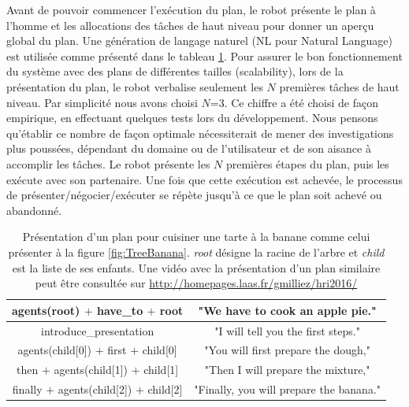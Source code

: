 \documentclass[a4paper,11pt,twoside]{StyleThese}
\begin{document}
Avant de pouvoir commencer l'exécution du plan, le robot présente le plan à l'homme et les allocations des tâches de haut niveau pour donner un aperçu global du plan. Une génération de langage naturel (NL pour Natural Language) est utilisée comme présenté dans le tableau \ref{table:pie-present}. 
Pour assurer le bon fonctionnement du système avec des plans de différentes tailles (scalability), lors de la présentation du plan, le robot verbalise seulement les  $N$ premières tâches de haut niveau. Par simplicité nous avons choisi $N$=$3$. Ce chiffre a été choisi de façon empirique, en effectuant quelques tests lors du développement. Nous pensons qu'établir ce nombre de façon optimale nécessiterait de mener des investigations plus poussées, dépendant du domaine ou de l'utilisateur et de son aisance à accomplir les tâches. Le robot présente les $N$ premières étapes du plan, puis les exécute avec son partenaire. Une fois que cette exécution est achevée, le processus de présenter/négocier/exécuter se répète jusqu'à ce que le plan soit achevé ou abandonné.


 
 
 \begin{table}
\centering
\scriptsize
\renewcommand{\arraystretch}{1.3}
\begin{tabular}{|c|c|}
\hline
   agents(root) $+$ have\_to $+$ root  & "We have to cook an apple pie." \\
   \hline
   introduce\_presentation & "I will tell you the first steps." \\
   \hline
   agents(child[0]) $+$ first $+$ child[0] & "You will first prepare the dough," \\
   \hline
   then $+$ agents(child[1]) $+$  child[1] & "Then I will prepare the mixture," \\
   \hline
   finally $+$ agents(child[2]) $+$  child[2] & "Finally, you will prepare the banana." \\
   \hline
\end{tabular}
\caption{Présentation d'un plan pour cuisiner une tarte à la banane comme celui présenter à la figure \ref{fig:TreeBanana}. \textit{root} désigne la racine de l'arbre et \textit{child} est la liste de ses enfants. Une vidéo avec la présentation d'un plan similaire peut être consultée sur \url{http://homepages.laas.fr/gmilliez/hri2016/}
}
 \label{table:pie-present}    
\end{table}
 
\end{document}
